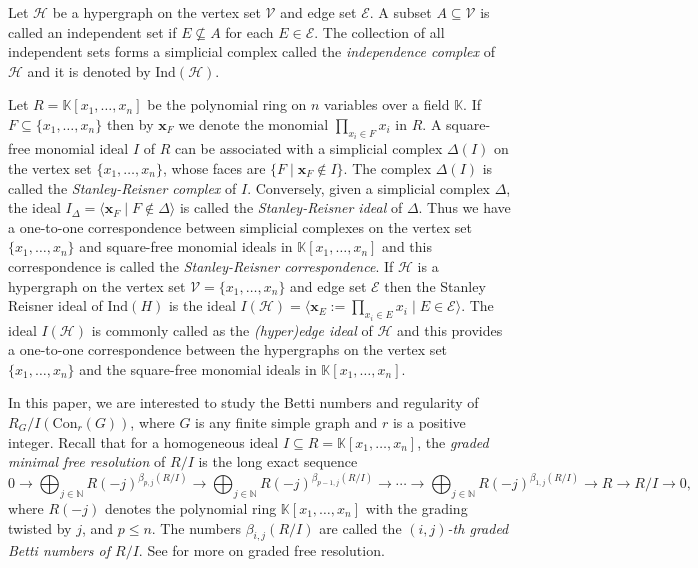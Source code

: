 \documentclass[12pt,reqno]{amsart}
\theoremstyle{definition}
\newcommand{\K}{\mathbb K}
\def\H{\mathcal{H}}
\def\V{\mathcal{V}}
\def\E{\mathcal{E}}
\def\C{\mathrm{Con}_r(G)}
\begin{document}
Let $\H$ be a hypergraph on the vertex set $\V$ and edge set $\E$. A subset $A\subseteq \V$ is called an independent set if $E\nsubseteq A$ for each $E\in \E$. The collection of all independent sets forms a simplicial complex called the {\it independence complex} of $\H$ and it is denoted by $\mathrm{Ind}(\H)$.

Let $R=\K[x_1,\ldots,x_n]$ be the polynomial ring on $n$ variables over a field $\K$. If $F\subseteq \{x_1,\ldots,x_n\}$ then by $\mathbf{x}_F$ we denote the monomial $\prod_{x_i\in F}x_i$ in $R$. A square-free monomial ideal $I$ of $R$ can be associated with a simplicial complex $\Delta(I)$ on the vertex set $\{x_1,\ldots,x_n\}$, whose faces are $\{F\mid \mathbf x_F\notin I\}$. The complex $\Delta(I)$ is called the {\it Stanley-Reisner complex} of $I$. Conversely, given a simplicial complex $\Delta$, the ideal $I_{\Delta}=\langle 
\mathbf{x}_{F}\mid F\notin \Delta \rangle$ is called the {\it Stanley-Reisner ideal} of $\Delta$. Thus we have a one-to-one correspondence between simplicial complexes on the vertex set $\{x_1,\ldots,x_n\}$ and square-free monomial ideals in $\K[x_1,\ldots,x_n]$ and this correspondence is called the {\it Stanley-Reisner correspondence}. If $\H$ is a hypergraph on the vertex set $\V=\{x_1,\ldots,x_n\}$ and edge set $\E$ then the Stanley Reisner ideal of $\mathrm{Ind}(H)$ is the ideal $I(\H)=\langle \mathbf{x}_E:=\prod_{x_i\in E}x_i\mid E\in \E \rangle$. The ideal $I(\H)$ is commonly called as the {\it (hyper)edge ideal} of $\H$ and this provides a one-to-one correspondence between the hypergraphs on the vertex set $\{x_1,\ldots,x_n\}$ and the square-free monomial ideals in $\K[x_1,\ldots,x_n]$.

In this paper, we are interested to study the Betti numbers and regularity of $R_G/I(\C)$, where $G$ is any finite simple graph and $r$ is a positive integer. Recall that for a homogeneous ideal $I \subseteq R = \mathbb{K}[x_1,\ldots,x_n]$, the {\it graded minimal free resolution} of $R/I$ is the long exact sequence 
$$0\rightarrow \bigoplus_{j \in \mathbb{N}} R(-j)^{\beta_{p,j}(R/I)}
\rightarrow \bigoplus_{j \in \mathbb{N}} R(-j)^{\beta_{p-1,j}(R/I)}
\rightarrow \cdots \rightarrow \bigoplus_{j \in \mathbb{N}}
R(-j)^{\beta_{1,j}(R/I)} \rightarrow R \rightarrow R/I \rightarrow 0,$$
where $R(-j)$ denotes the polynomial ring $\mathbb K[x_1,\ldots,x_n]$ with the grading
twisted by $j$, and $p \leq n$.  The numbers $\beta_{i,j}(R/I)$ are called the {\it $(i,j)$-th graded Betti numbers of $R/I$}. See \cite{RHV} for more on graded free resolution.
\end{document}
